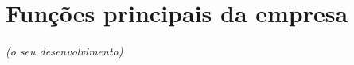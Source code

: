\section{Funções principais da empresa} \label{section: Funções principais da empresa}
\textit{(o seu desenvolvimento)}
